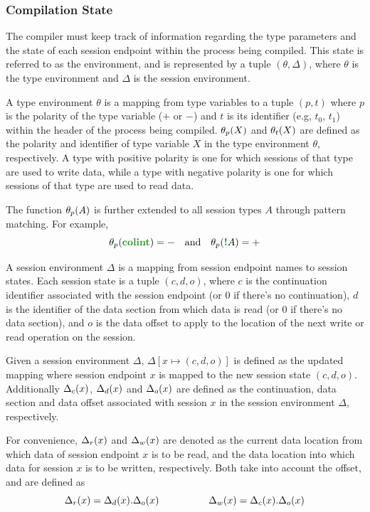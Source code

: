 \documentclass[sigconf,nonacm,natbib=true]{acmart}
\begin{document}
\subsubsection{Compilation State}

The compiler must keep track of information regarding the type parameters and the state of each session endpoint within the process being compiled. This state is referred to as the environment, and is represented by a tuple $(\theta, \Delta)$, where $\theta$ is the type environment and $\Delta$ is the session environment.

A type environment $\theta$ is a mapping from type variables to a tuple $(p, t)$ where $p$ is the polarity of the type variable ($+$ or $-$) and $t$ is its identifier (e.g, $t_0$, $t_1$) within the header of the process being compiled. $\theta_{p}(X)$ and $\theta_{t}(X)$ are defined as the polarity and identifier of type variable $X$ in the type environment $\theta$, respectively. A type with positive polarity is one for which sessions of that type are used to write data, while a type with negative polarity is one for which sessions of that type are used to read data.

The function $\theta_{p}(A)$ is further extended to all session types $A$ through pattern matching. For example, \[\polarityof{\theta}{\colintt} = - \quad\text{and}\quad \polarityof{\theta}{\bangt{A}} = +\]

A session environment $\Delta$ is a mapping from session endpoint names to session states. Each session state is a tuple $(c, d, o)$, where $c$ is the continuation identifier associated with the session endpoint (or $0$ if there's no continuation), $d$ is the identifier of the data section from which data is read (or $0$ if there's no data section), and $o$ is the data offset to apply to the location of the next write or read operation on the session.

Given a session environment $\Delta$, $\Delta[x \mapsto (c, d, o)]$ is defined as the updated mapping where session endpoint $x$ is mapped to the new session state $(c, d, o)$. Additionally $\Delta_c(x)$, $\Delta_d(x)$ and $\Delta_o(x)$ are defined as the continuation, data section and data offset associated with session $x$ in the session environment $\Delta$, respectively.

For convenience, $\Delta_r(x)$ and $\Delta_w(x)$ are denoted as the current data location from which data of session endpoint $x$ is to be read, and the data location into which data for session $x$ is to be written, respectively. Both take into account the offset, and are defined as \[\Delta_r(x) = \Delta_d(x).\Delta_o(x) \hspace{5em} \Delta_w(x) = \Delta_c(x).\Delta_o(x)\]
\end{document}
